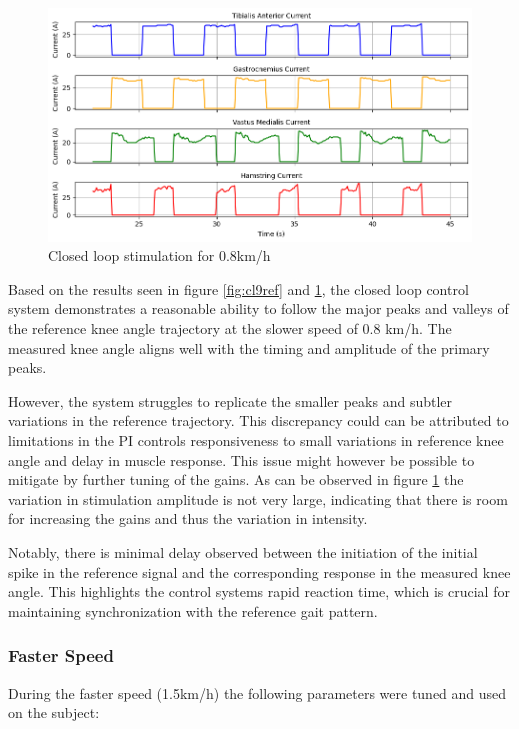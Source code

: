 \begin{figure} [H]
    \centering
    \includegraphics[width=0.9\linewidth]{images/CL9stimpng.png}
    \caption{Closed loop stimulation for 0.8km/h}
    \label{fig:cl9stim}
\end{figure}

Based on the results seen in figure \ref{fig:cl9ref} and \ref{fig:cl9stim}, the closed loop control system demonstrates a reasonable ability to follow the major peaks and valleys of the reference knee angle trajectory at the slower speed of 0.8 km/h. The measured knee angle aligns well with the timing and amplitude of the primary peaks. 

However, the system struggles to replicate the smaller peaks and subtler variations in the reference trajectory. This discrepancy could can be attributed to limitations in the PI controls responsiveness to small variations in reference knee angle and delay in muscle response. This issue might however be possible to mitigate by further tuning of the gains. As can be observed in figure \ref{fig:cl9stim} the variation in stimulation amplitude is not very large, indicating that there is room for increasing the gains and thus the variation in intensity.  

Notably, there is minimal delay observed between the initiation of the initial spike in the reference signal and the corresponding response in the measured knee angle. This highlights the control systems rapid reaction time, which is crucial for maintaining synchronization with the reference gait pattern.


\subsubsection{Faster Speed}
During the faster speed (1.5km/h) the following parameters were tuned and used on the subject:

